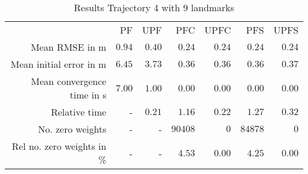 \begin{table}
\centering
\begin{tabular}{rrrrrrr}
 & PF & UPF & PFC & UPFC & PFS & UPFS \\
Mean RMSE in m & $0.94$ & $0.40$ & $0.24$ & $0.24$ & $0.24$ & $0.24$ \\
Mean initial error in m & $6.45$ & $3.73$ & $0.36$ & $0.36$ & $0.36$ & $0.37$ \\
Mean convergence time in s & $7.00$ & $1.00$ & $0.00$ & $0.00$ & $0.00$ & $0.00$ \\
Relative time & - & $0.21$ & $1.16$ & $0.22$ & $1.27$ & $0.32$ \\
No. zero weights & - & - & $90408$ & $0$ & $84878$ & $0$ \\
Rel no. zero weights in \% & - & - & $4.53$ & $0.00$ & $4.25$ & $0.00$ \\
\end{tabular}
\caption{Results Trajectory 4 with 9 landmarks}
\label{table:landmark_positions_4}
\end{table}
